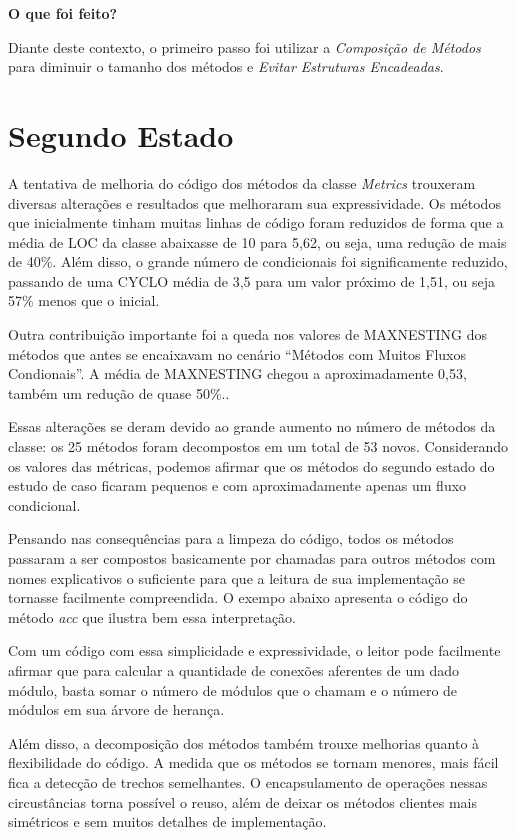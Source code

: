 \vskip 1.0cm
\textbf{O que foi feito?}

Diante deste contexto, o primeiro passo foi utilizar a \textit{Composição de Métodos} para
diminuir o tamanho dos métodos e \textit{Evitar Estruturas Encadeadas}.

\section{Segundo Estado}

A tentativa de melhoria do código dos métodos da classe \textit{Metrics}
trouxeram diversas alterações e resultados que melhoraram sua expressividade.
Os métodos que inicialmente tinham muitas linhas de código foram reduzidos de forma
que a média de LOC da classe abaixasse de 10 para 5,62, ou seja, uma redução de mais de 40\%.
Além disso, o grande número de condicionais foi significamente reduzido,
passando de uma CYCLO média de 3,5 para um valor próximo de 1,51, ou seja 57\% menos que o inicial.

Outra contribuição importante foi a queda nos valores de MAXNESTING dos métodos
que antes se encaixavam no cenário ``Métodos com Muitos Fluxos Condionais''. A média de
MAXNESTING chegou a aproximadamente 0,53, também um redução de quase 50\%..

Essas alterações se deram devido ao grande aumento no número de métodos da classe:
os 25 métodos foram decompostos em um total de 53 novos. Considerando os valores
das métricas, podemos afirmar que os métodos do segundo estado do estudo de caso
ficaram pequenos e com aproximadamente apenas um fluxo condicional.

Pensando nas consequências para a limpeza do código, todos os métodos passaram
a ser compostos basicamente por chamadas para outros métodos com nomes explicativos
o suficiente para que a leitura de sua implementação se tornasse facilmente compreendida.
O exempo abaixo apresenta o código do método \textit{acc} que ilustra bem essa interpretação.



Com um código com essa simplicidade e expressividade, o leitor pode facilmente
afirmar que para calcular a quantidade de conexões aferentes de um dado módulo, basta
somar o número de módulos que o chamam e o número de módulos em sua árvore de herança.

Além disso, a decomposição dos métodos também trouxe melhorias quanto à flexibilidade
do código. A medida que os métodos se tornam menores, mais fácil fica a detecção de
trechos semelhantes. O encapsulamento de operações nessas circustâncias torna possível
o reuso, além de deixar os métodos clientes mais simétricos e sem muitos detalhes de implementação.

